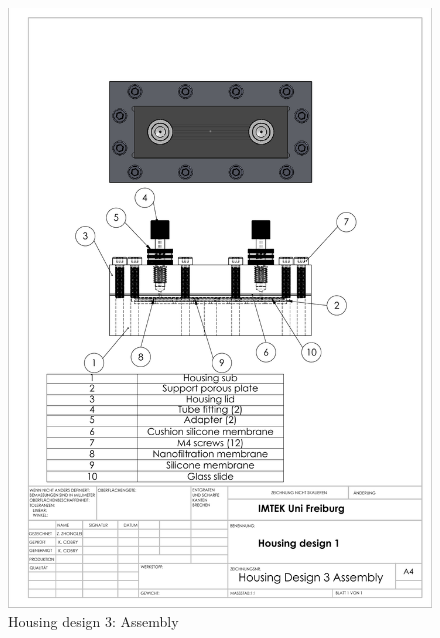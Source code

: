 \begin{figure}[h]%
\centering
\includegraphics[width=1\textwidth]{figures/appendix/housingdesign3}%
\caption{Housing design 3: Assembly}%
\label{housingdesign2}%
\end{figure}

\clearpage

